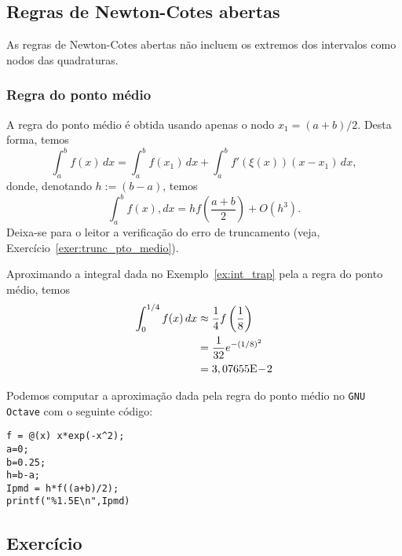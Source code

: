 \subsection{Regras de Newton-Cotes abertas}

As regras de Newton-Cotes abertas não incluem os extremos dos intervalos como nodos das quadraturas.

\subsubsection{Regra do ponto médio}

A regra do ponto médio é obtida usando apenas o nodo $x_1=(a+b)/2$. Desta forma, temos
\begin{equation}
  \int_a^b f(x)\,dx = \int_a^b f(x_1)\,dx + \int_a^b f'(\xi(x))(x-x_1)\,dx,
\end{equation}
donde, denotando $h:=(b-a)$, temos
\begin{equation}
  \int_a^b f(x),dx = hf\left(\frac{a+b}{2}\right) + O(h^3).
\end{equation}
Deixa-se para o leitor a verificação do erro de truncamento (veja, Exercício~\ref{exer:trunc_pto_medio}).

\begin{ex}\label{ex:int_pto_medio}
  Aproximando a integral dada no Exemplo~\ref{ex:int_trap} pela a regra do ponto médio, temos
  \begin{align}
    \int_0^{1/4} f(x)\,dx &\approx \frac{1}{4}f\left(\frac{1}{8}\right)\\
    &= \frac{1}{32}e^{-(1/8)^2}\\
    &= 3,07655\mathrm{E}\!-\!2
  \end{align}

\ifisoctave
Podemos computar a aproximação dada pela regra do ponto médio no \verb+GNU Octave+ com o seguinte código:
\begin{verbatim}
f = @(x) x*exp(-x^2);
a=0;
b=0.25;
h=b-a;
Ipmd = h*f((a+b)/2);
printf("%1.5E\n",Ipmd)
\end{verbatim}
\fi
\end{ex}

\subsection*{Exercício}

